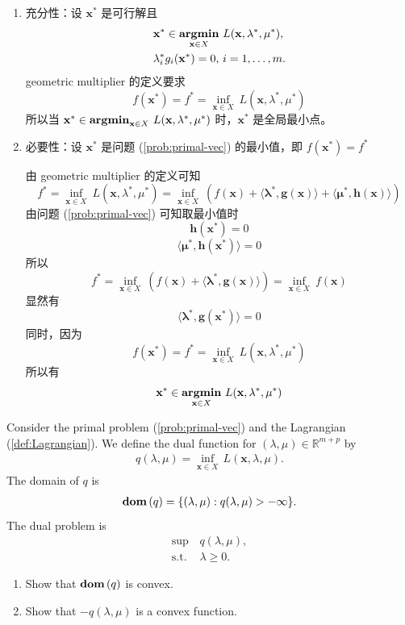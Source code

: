 \documentclass[11pt,letter,notitlepage]{article}
\DeclareMathOperator*{\argmin}{\bf argmin}
\DeclareMathOperator*{\dom}{\bf dom\,}
\begin{document}
\begin{solution}
	\begin{enumerate}
		\item 充分性：设 $\mathbf{x}^*$ 是可行解且
		      \begin{align*}
			       & \mathbf{x}^*\in\argmin_{\mathbf{x}\in X}\,L(\mathbf{x},\lambda^*,\mu^*), \\
			       & \lambda_i^*g_i(\mathbf{x}^*)=0,\,i=1,\ldots,m.
		      \end{align*}
		      geometric multiplier 的定义要求
		      $$f(\mathbf{x}^*)=f^*=\inf_{\mathbf{x}\in X}\ L(\mathbf{x},\lambda^*,\mu^*)$$
		      所以当 $\mathbf{x}^*\in\argmin_{\mathbf{x}\in X}\,L(\mathbf{x},\lambda^*,\mu^*)$ 时，$\mathbf{x}^*$ 是全局最小点。
		\item  必要性：设 $\mathbf{x}^*$ 是问题 (\ref{prob:primal-vec}) 的最小值，即 $f(\mathbf{x}^*)=f^*$

		      由 geometric multiplier 的定义可知
		      $$f^*=\inf_{\mathbf{x}\in X}\ L(\mathbf{x},\lambda^*,\mu^*)
			      =\inf_{\mathbf{x}\in X}\ \left( f(\mathbf{x}) +\langle \mathbf{\lambda}^*,\mathbf{g}(\mathbf{x}) \rangle + \langle \mathbf{\mu}^*,\mathbf{h}(\mathbf{x}) \rangle \right) $$
		      由问题 (\ref{prob:primal-vec}) 可知取最小值时
		      $$\mathbf{h}(\mathbf{x^*})=0$$
		      $$\langle \mathbf{\mu}^*,\mathbf{h}(\mathbf{x^*}) \rangle=0$$
		      所以
		      $$f^*=\inf_{\mathbf{x}\in X}\ \left( f(\mathbf{x}) +\langle \mathbf{\lambda}^*,\mathbf{g}(\mathbf{x}) \rangle \right)
			      = \inf_{\mathbf{x}\in X}\ f(\mathbf{x}) $$
		      显然有
		      $$\langle \mathbf{\lambda}^*,\mathbf{g}(\mathbf{x^*})\rangle =0$$
		      同时，因为
		      $$f(\mathbf{x}^*)=f^*=\inf_{\mathbf{x}\in X}\ L(\mathbf{x},\lambda^*,\mu^*)$$
		      所以有
		      $$\mathbf{x}^*\in\argmin_{\mathbf{x}\in X}\,L(\mathbf{x},\lambda^*,\mu^*)$$
	\end{enumerate}
\end{solution}

\newpage
\begin{exercise}
	Consider the primal problem (\ref{prob:primal-vec}) and the Lagrangian (\ref{def:Lagrangian}). We define the dual function for $(\lambda,\mu)\in\mathbb{R}^{m+p}$ by
	\begin{align*}
		q(\lambda,\mu)=\inf_{\mathbf{x}\in X}\,L(\mathbf{x},\lambda,\mu).
	\end{align*}
	The domain of $q$ is
	\begin{align*}
		\dom(q)=\{(\lambda,\mu):q(\lambda,\mu)>-\infty\}.
	\end{align*}
	The dual problem is
	\begin{align*}
		\sup\,       & q(\lambda,\mu), \\
		\mbox{s.t. } & \lambda\geq0.
	\end{align*}
	\begin{enumerate}
		\item Show that $\dom(q)$ is convex.
		\item Show that $-q(\lambda,\mu)$ is a convex function.
	\end{enumerate}
\end{exercise}
\end{document}
